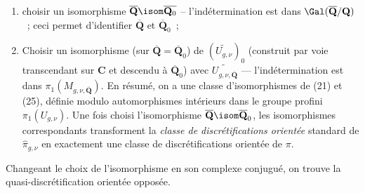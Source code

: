 \begin{enumerate} 
    \item[1)] choisir un isomorphisme $\overline{\mathbf{Q}} \isom \overline{\mathbf{Q}_0}$ -- l'indétermination est dans ${\Gal}(\overline{\mathbf{Q}}/\mathbf{Q})$~; ceci permet d'identifier $\overline{\mathbf{Q}}$ et $\overline{\mathbf{Q}}_0$~;
    \item[2)] Choisir un isomorphisme (sur $\overline{\mathbf{Q}}= \overline{\mathbf{Q}}_0$) de $(\widetilde{U_{g,\nu}})_0$  (construit par voie transcendant sur $\mathbf{C}$ et descendu à $\overline{\mathbf{Q}}_0$) avec $\widetilde{U_{g,\nu,\overline{\mathbf{Q}}}}$ --- l'indétermination est dans $\pi_1(M_{g,\nu,\overline{\mathbf{Q}}})$.
	En résumé, on a une classe d'isomorphismes de (21) et (25), définie modulo automorphismes intérieurs dans le groupe profini $\pi_1(U_{g,\nu})$. Une fois choisi l'isomorphisme $\overline{\mathbf{Q}} \isom \overline{\mathbf{Q}}_0$, les isomorphismes correspondants transforment la \emph{classe de discrétifications orientée} standard de $\hat{\pi}_{g,\nu}$ en exactement une classe de discrétifications orientée de $\pi$.
\end{enumerate}
Changeant le choix de l'isomorphisme en son complexe conjugué, on trouve la quasi-discrétification orientée opposée. %

